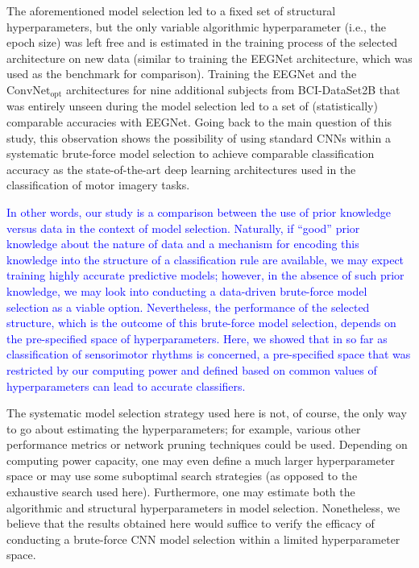 \documentclass{ieeeaccess}
\newcommand{\quotes}[1]{``#1''}
\begin{document}
{    {The aforementioned model selection led to a fixed set of structural hyperparameters, but the only variable algorithmic hyperparameter (i.e., the epoch size) was left free and is estimated in the training process of the selected architecture on new data (similar to training the EEGNet architecture, which was used as the benchmark for comparison). Training the EEGNet and the $\text{ConvNet}_{\text{opt}}$ architectures for nine additional subjects from BCI-DataSet2B that was entirely unseen during the model selection led to a set of (statistically) comparable accuracies with EEGNet. Going back to the main question of this study, this observation shows the possibility of using standard CNNs within a systematic brute-force model selection to achieve comparable classification accuracy as the state-of-the-art deep learning architectures used in the classification of motor imagery tasks. }
    
    \textcolor{blue}{In other words, our study is a comparison between the use of prior knowledge versus data in the context of model selection. Naturally, if  \quotes{good} prior knowledge about the nature of data and a mechanism for encoding this knowledge into the structure of a classification rule are available, we may expect training highly accurate predictive models; however, in the absence of such prior knowledge, we may look into conducting a data-driven brute-force model selection as a viable option. Nevertheless, the performance of the selected structure, which is the outcome of this brute-force model selection, depends on the pre-specified space of hyperparameters. Here, we showed that in so far as classification of sensorimotor rhythms is concerned, a pre-specified space that was restricted by our computing power and defined based on common values of hyperparameters can lead to accurate classifiers.} 
    
    {The systematic model selection strategy used here is not, of course, the only way to go about estimating the hyperparameters; for example, various other performance metrics or network pruning techniques could be used. Depending on computing power capacity, one may even define a much larger hyperparameter space or may use some suboptimal search strategies (as opposed to the exhaustive search used here). Furthermore, one may estimate both the algorithmic and structural hyperparameters in model selection. Nonetheless, we believe that the results obtained here would suffice to verify the efficacy of conducting a brute-force CNN model selection within a limited hyperparameter space.}
   
}
\end{document}
